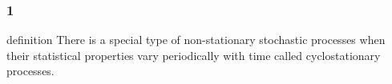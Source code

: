 \documentclass[10pt,xcolor={dvipsnames}]{beamer}
\begin{document}
    \begin{frame}
    \frametitle{1}
    \begin{block}{definition}
        There is a special type of non-stationary stochastic 
 processes\footnotemark{} when their statistical properties vary 
periodically\footnotemark{} with time called cyclostationary processes\footnotemark[1].
  \end{block}
  \setcounter{footnote}{1}
  \addtocounter{footnote}{1}
\end{frame}
\end{document}
